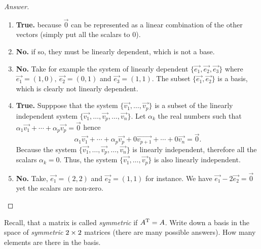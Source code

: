 \begin{proof}[Answer]
  \text{}
  \begin{enumerate}
    \item \textbf{True.} because $\vec{0}$ can be represented as a linear 
      combination of the other vectors (simply put all the scalars to $0$).
    \item \textbf{No.} if so, they must be linearly dependent, which is not a base.
    \item \textbf{No.} Take for example the system of linearly dependent
      $\{\vec{e_1},\vec{e_2},\vec{e_3}\}$ where 
      $\vec{e_1}=(1,0),~\vec{e_2}=(0,1)$ and $\vec{e_3}=(1,1)$.
      The subset $\{\vec{e_1},\vec{e_2}\}$ is a basis, which is 
      clearly not linearly dependent.
    \item \textbf{True.} Supppose that the system 
      $\{\vec{v_1},\dots,\vec{v_p}\}$
      is a subset of the linearly independent system 
      $\{\vec{v_1},\dots,\vec{v_p},\dots,\vec{v_n}\}$. Let $\alpha_k$ the 
      real numbers such that
      $\alpha_{1}\vec{v_1}+\cdots+\alpha_{p}\vec{v_p}=\vec{0}$
      hence
      \[
        \alpha_{1}\vec{v_1}+\cdots+\alpha_{p}\vec{v_p}+
        0\vec{v_{p+1}}+\cdots+0\vec{v_n}=\vec{0}.
      \]
      Because the system $\{\vec{v_1},\dots,\vec{v_p},\dots,\vec{v_n}\}$
      is linearly independent, therefore all the scalars $\alpha_k=0$. 
      Thus, the system $\{\vec{v_1},\dots,\vec{v_p}\}$ is also linearly
      independent.
    \item \textbf{No.} Take, $\vec{e_1}=(2,2)$ and $\vec{e_2}=(1,1)$ for instance.
      We have $\vec{e_1}-2\vec{e_2}=\vec{0}$ yet the scalars are non-zero.
  \end{enumerate}
\end{proof}
\begin{exercise}
  Recall, that a matrix is called \emph{symmetric} if 
  $A^\mathrm{T}=A$. Write down a basis in the space of \emph{symmetric}
  $2\times 2$ matrices (there are many possible answers). How many
  elements are there in the basis.
\end{exercise}
